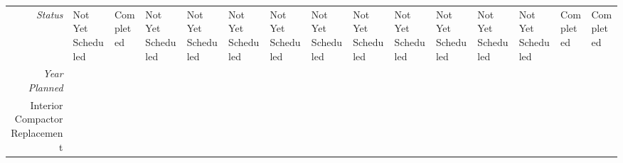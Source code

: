 \begin{tabularx}{\textwidth}{r|X|X|X|X|X|X|X|X|X|X|X|X|X|X|}
    \multicolumn{1}{|r|}{\cellcolor{ccorangelight}\textit{Status}}                & Not Yet Scheduled                                                         & Completed                                                         & Not Yet Scheduled                                                         & Not Yet Scheduled                                                         & Not Yet Scheduled                                                         & Not Yet Scheduled                                                         & Not Yet Scheduled                                                         & Not Yet Scheduled                                                         & Not Yet Scheduled                                                         & Not Yet Scheduled                                                         & Not Yet Scheduled                                                         & Not Yet Scheduled                                                         & Completed                                                         & Completed                                                         \\
    \multicolumn{1}{|r|}{\cellcolor{ccorangelight}\textit{Year Planned}}                  &                                                      &                                                      &                                                      &                                                      &                                                      &                                                      &                                                      &                                                      &                                                      &                                                      &                                                      &                                                      &                                                      &                                                      \\ \hline
\multicolumn{1}{|V{.2\columnwidth}|}{\cellcolor{ccorangelight}Interior Compactor Replacement}          &                                                                  &                                                                  &                                                                  &                                                                  &                                                                  &                                                                  &                                                                  &                                                                  &                                                                  &                                                                  &                                                                  &                                                                  &                                                                  &                                                                  \\

\end{tabularx}
